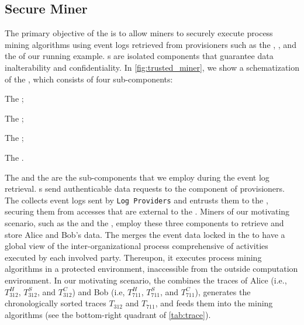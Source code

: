 \subsection{Secure Miner}
The primary objective of the  is to allow miners to securely execute process mining algorithms using event logs retrieved from provisioners such as the , , and the  of our running example. s are isolated components that guarantee data inalterability and confidentiality. In \cref{fig:trusted_miner}, we show a schematization of the , which consists of four sub-components:
\begin{inparaenum}
    \item The ;
    \item The ;
    \item The ; 
    \item The .
\end{inparaenum}
The  and the  are the sub-components that we employ during the event log retrieval. s send authenticable data requests to the  component of provisioners. The  collects event logs sent by \texttt{Log Providers} and entrusts them to the , securing them from accesses that are external to the .
Miners of our motivating scenario, such as the  and the , employ these three components to retrieve and store Alice and Bob's data. The  merges the event data locked in the  to have a global view of the inter-organizational process comprehensive of activities executed by each involved party. Thereupon, it executes process mining algorithms in a protected environment, inaccessible from the outside computation environment.
In our motivating scenario, the  combines the traces of Alice (i.e., $T^H_{312}$, $T^S_{312}$, and $T^C_{312}$) and Bob (i.e, $T^H_{711}$, $T^S_{711}$, and $T^C_{711}$), generates the chronologically sorted traces $T_{312}$ and $T_{711}$, and feeds them into the mining algorithms (see the bottom-right quadrant of \cref{tab:trace}).



